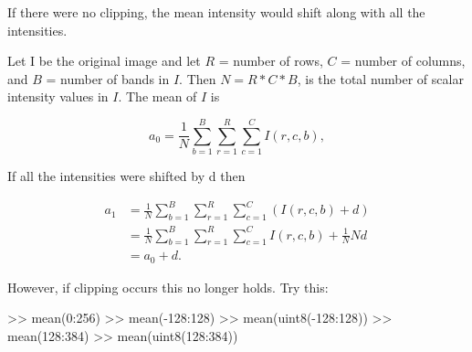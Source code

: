 \documentclass[11pt]{article}
\newenvironment{Shaded}{}{}
\newcommand{\FloatTok}[1]{\textcolor[rgb]{0.25,0.63,0.44}{{#1}}}
\newcommand{\NormalTok}[1]{{#1}}
\begin{document}
If there were no clipping, the mean intensity would shift along with all
the intensities.

Let I be the original image and let \(R\) = number of rows, \(C\) =
number of columns, and \(B\) = number of bands in \(I\). Then
\(N = R * C * B\), is the total number of scalar intensity values in
\(I\). The mean of \(I\) is

\[a_0=\frac{1}{N} \sum_{b=1}^{B} \sum_{r=1}^{R} \sum_{c=1}^{C} I(r,c,b),\]

If all the intensities were shifted by d then

\[
\begin{equation} \label{eq1}
    \begin{split}
        a_1 & = \frac{1}{N} \sum_{b=1}^{B} \sum_{r=1}^{R} \sum_{c=1}^{C} (I(r,c,b)+d) \\
            & = \frac{1}{N} \sum_{b=1}^{B} \sum_{r=1}^{R} \sum_{c=1}^{C} I(r,c,b) + \frac{1}{N}Nd\\
            & = a_0+d.
    \end{split}
\end{equation}
\]

However, if clipping occurs this no longer holds. Try this:

\begin{Shaded}
\begin{Highlighting}[]
\NormalTok{>> mean(}\FloatTok{0}\NormalTok{:}\FloatTok{256}\NormalTok{)}
\NormalTok{>> mean(-}\FloatTok{128}\NormalTok{:}\FloatTok{128}\NormalTok{)}
\NormalTok{>> mean(uint8(-}\FloatTok{128}\NormalTok{:}\FloatTok{128}\NormalTok{))}
\NormalTok{>> mean(}\FloatTok{128}\NormalTok{:}\FloatTok{384}\NormalTok{)}
\NormalTok{>> mean(uint8(}\FloatTok{128}\NormalTok{:}\FloatTok{384}\NormalTok{))}
\end{Highlighting}
\end{Shaded}
\end{document}
